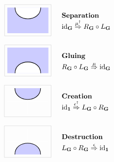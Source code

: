 \documentclass[a4paper,12pt]{article}
\makeatletter
\theoremstyle{definition}
\newcommand\cat[1]{{\ensuremath{\bf #1}}}
\renewcommand{\-}[0]{\nobreakdash-\hspace{0pt}}
\newcommand\id{\ensuremath{\mathrm{id}}}
\newcommand\GB{\ensuremath{R_{\cat G}}}
\newcommand\BG{\ensuremath{L _{\cat G}}}
\newcommand\xtoo[1]{\ensuremath{\smash{{}\stackrel{\smash{#1}}{\Rightarrow}{}}}}
\newcommand{\sdag}{{\ensuremath{\scriptscriptstyle{\dag}}}}
\def\syntaxfill{blue!20}
\def\innerboxsep{3pt}
\def\innersep{4pt}
\def\sep{5pt}
\newcommand\vc[1]{\begin{tabular}{@{}l}#1\end{tabular}}
\newcommand\separatetwocells{\\[\sep]}
\newcommand{\centerdia}[1]{\ensuremath{#1}}
\newcommand\newtwocell[3]{\centerdia{\begin{aligned}
\begin{tikzpicture}[scale=1.3]
    #1
    \draw [black!20]
        ([xshift=-\innerboxsep, yshift=-\innerboxsep] current bounding box.south west)
        rectangle
        ([xshift=\innerboxsep, yshift=\innerboxsep] current bounding box.north east);
\end{tikzpicture}
\end{aligned}}
& \hspace{15pt} \makebox[120pt][l]{\bf\vc{#2 \\[\innersep] #3}}}
\makeatother
\begin{document}
\begin{align*}
\newtwocell{
    \draw [fill=\syntaxfill, draw=none] (0.2,-0.5)
        to (1.8,-0.5)
        to (1.8,-1.5)
        to (0.2,-1.5)
        to (0.2,-0.5);
\draw [fill=white, thick] (0.5,-0.5)
        to [out=down, in=down, looseness=1.5] (1.5,-0.5);
}
{Separation}
{$\id _{\cat G} \xtoo {\mu ^\dag} \GB \circ \BG$}
\separatetwocells
\newtwocell{
    \draw [fill=\syntaxfill, draw=none] (0.2,0.5)
        to (1.8,0.5)
        to (1.8,1.5)
        to (0.2,1.5)
        to (0.2,0.5);
    \draw [fill=white, thick] (0.5,0.5)
        to [out=up, in=up, looseness=1.5] (1.5,0.5);
}
{Gluing}
{$\GB \circ \BG \xtoo {\mu} \id _{\cat G}$}
\separatetwocells
\newtwocell{
    \draw [white] (0.2,1) to (1.8,1);
    \draw [fill=\syntaxfill, thick] (0.5,1.5)
        to [out=down, in=down, looseness=1.5] (1.5,1.5);
    \draw [thick, white] (1,0.5) to (1,1);
}
{Creation}
{$\id _{\cat 1} \xtoo {\epsilon ^\sdag} \BG \circ \GB$}
\separatetwocells
\newtwocell{
    \draw [white] (0.2,-1) to (1.8,-1);
    \draw [fill=\syntaxfill, thick] (0.5,-1.5)
        to [out=up, in=up, looseness=1.5] (1.5,-1.5);
    \draw [thick, white] (1,-0.5) to (1,-1);
}
{Destruction}
{$\BG \circ \GB \xtoo \epsilon \id _{\cat 1}$}
\end{align*}
\end{document}
